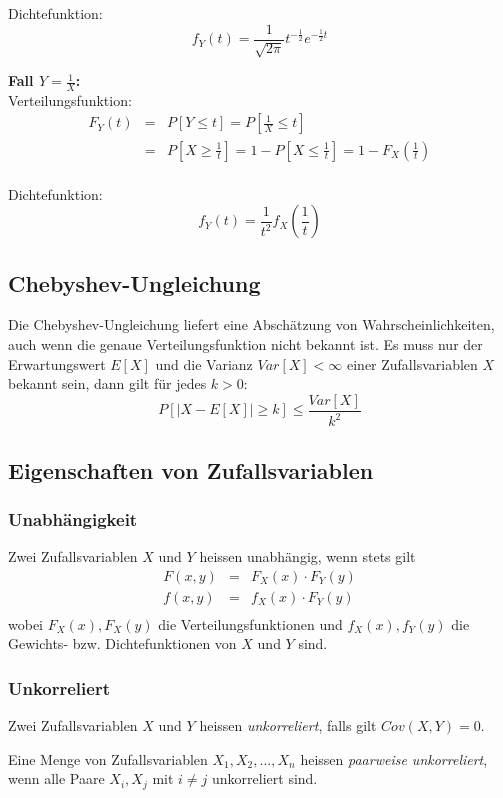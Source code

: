 \documentclass[10pt,a4paper,twocolumn]{article}
\begin{document}
Dichtefunktion:
\[
f_Y(t)=\frac{1}{\sqrt{2\pi}}t^{-\frac{1}{2}}e^{-\frac{1}{2}t}
\]

\textbf{Fall \boldmath$Y=\frac{1}{X}$:} \\
Verteilungsfunktion:
\[
\begin{array}{rcl}
	F_Y(t) & = & P[Y\leq t]=P[\frac{1}{X}\leq t] \\
	& = & P[X\geq\frac{1}{t}]=1-P[X\leq\frac{1}{t}]=1-F_X(\frac{1}{t}) \\
\end{array}
\]

Dichtefunktion:
\[
f_Y(t)=\frac{1}{t^2}f_X\left(\frac{1}{t}\right)
\]

\subsection{Chebyshev-Ungleichung}
Die Chebyshev-Ungleichung liefert eine Abschätzung von Wahrscheinlichkeiten, auch wenn die genaue Verteilungsfunktion nicht bekannt ist. Es muss nur der Erwartungswert $E[X]$ und die Varianz $Var[X] < \infty$ einer Zufallsvariablen $X$ bekannt sein, dann gilt für jedes $k > 0$:
\[
P\left[|X - E[X]| \geq k \right] \leq \frac{Var[X]}{k^2}
\]

\subsection{Eigenschaften von Zufallsvariablen}

\subsubsection{Unabhängigkeit}
Zwei Zufallsvariablen $X$ und $Y$ heissen unabhängig, wenn stets gilt
\[
\begin{array}{rcl}
	F(x,y) & = & F_X(x) \cdot F_Y(y) \\
	f(x,y) & = & f_X(x) \cdot F_Y(y) \\
\end{array}
\]
wobei $F_X(x), F_X(y)$ die Verteilungsfunktionen und $f_X(x), f_Y(y)$ die Gewichts- bzw. Dichtefunktionen von $X$ und $Y$ sind.

\subsubsection{Unkorreliert}
Zwei Zufallsvariablen $X$ und $Y$ heissen \emph{unkorreliert}, falls gilt $Cov(X,Y)=0$.

Eine Menge von Zufallsvariablen $X_1,X_2,...,X_n$ heissen \emph{paarweise unkorreliert}, wenn alle Paare $X_i,X_j$ mit $i\neq j$ unkorreliert sind.
\end{document}
